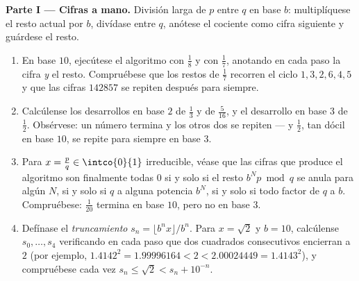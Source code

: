 \begin{problem}
\medskip
\noindent\textbf{Parte I --- Cifras a mano.} División larga de $p$
entre $q$ en base $b$: multiplíquese el resto actual por $b$, divídase
entre $q$, anótese el cociente como cifra siguiente y guárdese el resto.
\begin{enumerate}
  \item En base $10$, ejecútese el algoritmo con $\frac 18$ y con
        $\frac 17$, anotando en cada paso la cifra \emph{y} el resto.
        Compruébese que los restos de $\frac 17$ recorren el ciclo
        $1, 3, 2, 6, 4, 5$ y que las cifras $142857$ se repiten después
        para siempre.
  \item Calcúlense los desarrollos en base $2$ de $\frac 13$ y de
        $\frac{5}{16}$, y el desarrollo en base $3$ de $\frac 12$.
        Obsérvese: un número termina y los otros dos se repiten --- y
        $\frac 12$, tan dócil en base $10$, se repite para siempre en
        base $3$.
  \item Para $x = \frac pq \in \intco{0}{1}$ irreducible, véase que las
        cifras que produce el algoritmo son finalmente todas $0$ si y
        solo si el resto $b^N p \bmod q$ se anula para algún $N$, si y
        solo si $q$  a alguna potencia $b^N$, si y solo si todo
        factor  de $q$  a $b$. Compruébese:
        $\frac{1}{20}$ termina en base $10$, pero no en base $3$.
  \item Defínase el \emph{truncamiento}
        $s_n = \lfloor b^n x \rfloor / b^n$. Para $x = \sqrt 2$ y
        $b = 10$, calcúlense $s_0, \dots, s_4$ verificando en cada paso
        que dos cuadrados consecutivos encierran a $2$ (por ejemplo,
        $1.4142^2 = 1.99996164 < 2 < 2.00024449 = 1.4143^2$), y
        compruébese cada vez $s_n \leq \sqrt 2 < s_n + 10^{-n}$.
\end{enumerate}


\end{problem}
